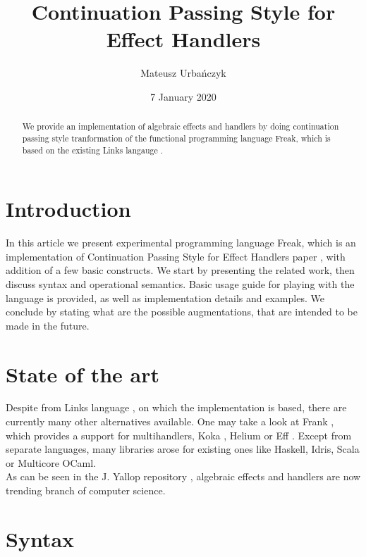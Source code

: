 \documentclass{article}
\title{Continuation Passing Style for Effect Handlers}
\author{Mateusz Urbańczyk}
\date{7 January 2020}
\theoremstyle{definition}
\theoremstyle{lemma}
\theoremstyle{observation}
\theoremstyle{theorem}
\begin{document}
\maketitle

\begin{abstract}

    We provide an implementation of algebraic effects and handlers by doing continuation
    passing style tranformation of the functional programming language Freak,
    which is based on the existing Links langauge \cite{handlers-cps}.

\end{abstract}

\section{Introduction}

In this article we present experimental programming language Freak, which is an
implementation of Continuation Passing Style for Effect Handlers paper \cite{handlers-cps},
with addition of a few basic constructs. We start by presenting the related work,
then discuss syntax and operational semantics. Basic usage guide for playing with
the language is provided, as well as implementation details and examples. We conclude
by stating what are the possible augmentations, that are intended to be made in the future.

\section{State of the art}

    Despite from Links language \cite{handlers-cps}, on which the implementation
    is based, there are currently many other alternatives available. One may take
    a look at Frank \cite{frank}, which provides a support for multihandlers,
    Koka \cite{leijen-koka}, Helium \cite{helium} or Eff \cite{eff}. Except from
    separate languages, many libraries arose for existing ones like Haskell,
    Idris, Scala or Multicore OCaml. \\

    As can be seen in the J. Yallop repository \cite{effects-bibliography},
    algebraic effects and handlers are now trending branch of computer science.

\section{Syntax}
\end{document}
